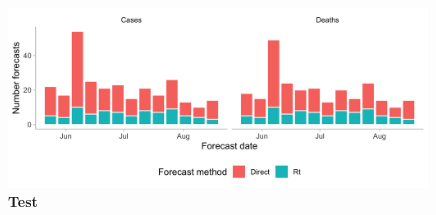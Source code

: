 \documentclass[10pt,a4paper,twocolumn]{article}
\begin{document}

\begin{figure}[H]
\centering
\includegraphics[width=0.99\textwidth]{../output/figures/num-forecasters-week.png}
\caption{\bf{Test}}
\label{fig:num-forecasters}
\end{figure}


\clearpage

{\small
}

\bigskip





\end{document}
